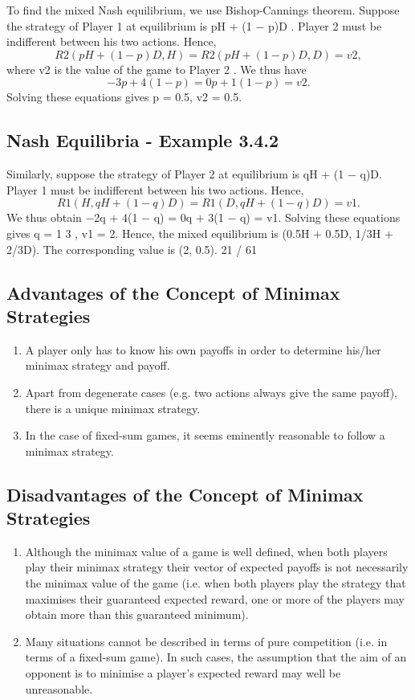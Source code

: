 \documentclass[]{report}
\begin{document}
To find the mixed Nash equilibrium, we use Bishop-Cannings
theorem. Suppose the strategy of Player 1 at equilibrium is
pH + (1 − p)D . Player 2 must be indifferent between his two
actions. Hence,
\[R2(pH + (1 − p)D, H) = R2(pH + (1 − p)D, D) = v2,\]
where v2 is the value of the game to Player 2 .
We thus have \[−3p + 4(1 − p) = 0p + 1(1 − p) = v2.\] Solving these
equations gives p = 0.5, v2 = 0.5.
\subsection{Nash Equilibria - Example 3.4.2}
Similarly, suppose the strategy of Player 2 at equilibrium is
qH + (1 − q)D. Player 1 must be indifferent between his two
actions. Hence,
\[R1(H, qH + (1 − q)D) = R1(D, qH + (1 − q)D) = v1.\]
We thus obtain −2q + 4(1 − q) = 0q + 3(1 − q) = v1. Solving
these equations gives q =
1
3
, v1 = 2.
Hence, the mixed equilibrium is (0.5H + 0.5D, 1/3H + 2/3D). The
corresponding value is (2, 0.5).
21 / 61
\subsection{Advantages of the Concept of Minimax Strategies}
\begin{enumerate}
	\item  A player only has to know his own payoffs in order to
	determine his/her minimax strategy and payoff.
	\item  Apart from degenerate cases (e.g. two actions always
	give the same payoff), there is a unique minimax
	strategy.
	\item  In the case of fixed-sum games, it seems eminently
	reasonable to follow a minimax strategy.
\end{enumerate}

\subsection{Disadvantages of the Concept of Minimax Strategies}
\begin{enumerate}
	\item  Although the minimax value of a game is well
	defined, when both players play their minimax
	strategy their vector of expected payoffs is not
	necessarily the minimax value of the game (i.e. when
	both players play the strategy that maximises their
	guaranteed expected reward, one or more of the
	players may obtain more than this guaranteed
	minimum).
\item Many situations cannot be described in terms of pure
	competition (i.e. in terms of a fixed-sum game). In
	such cases, the assumption that the aim of an
	opponent is to minimise a player’s expected reward
	may well be unreasonable.
\end{enumerate}
\end{document}
